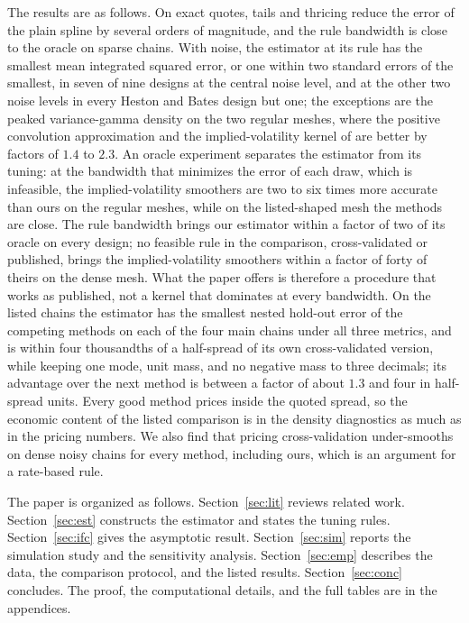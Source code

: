 \documentclass[preprint,12pt,authoryear,times]{elsarticle}
\begin{document}
The results are as follows. On exact quotes, tails and thricing reduce the error of the plain spline by several orders of magnitude, and the rule bandwidth is close to the oracle on sparse chains. With noise, the estimator at its rule has the smallest mean integrated squared error, or one within two standard errors of the smallest, in seven of nine designs at the central noise level, and at the other two noise levels in every Heston and Bates design but one; the exceptions are the peaked variance-gamma density on the two regular meshes, where the positive convolution approximation and the implied-volatility kernel of \citeauthor{aitsahalia1998} are better by factors of \(1.4\) to \(2.3\). An oracle experiment separates the estimator from its tuning: at the bandwidth that minimizes the error of each draw, which is infeasible, the implied-volatility smoothers are two to six times more accurate than ours on the regular meshes, while on the listed-shaped mesh the methods are close. The rule bandwidth brings our estimator within a factor of two of its oracle on every design; no feasible rule in the comparison, cross-validated or published, brings the implied-volatility smoothers within a factor of forty of theirs on the dense mesh. What the paper offers is therefore a procedure that works as published, not a kernel that dominates at every bandwidth. On the listed chains the estimator has the smallest nested hold-out error of the competing methods on each of the four main chains under all three metrics, and is within four thousandths of a half-spread of its own cross-validated version, while keeping one mode, unit mass, and no negative mass to three decimals; its advantage over the next method is between a factor of about \(1.3\) and four in half-spread units. Every good method prices inside the quoted spread, so the economic content of the listed comparison is in the density diagnostics as much as in the pricing numbers. We also find that pricing cross-validation under-smooths on dense noisy chains for every method, including ours, which is an argument for a rate-based rule.

The paper is organized as follows. Section~\ref{sec:lit} reviews related work. Section~\ref{sec:est} constructs the estimator and states the tuning rules. Section~\ref{sec:ifc} gives the asymptotic result. Section~\ref{sec:sim} reports the simulation study and the sensitivity analysis. Section~\ref{sec:emp} describes the data, the comparison protocol, and the listed results. Section~\ref{sec:conc} concludes. The proof, the computational details, and the full tables are in the appendices.
\end{document}
